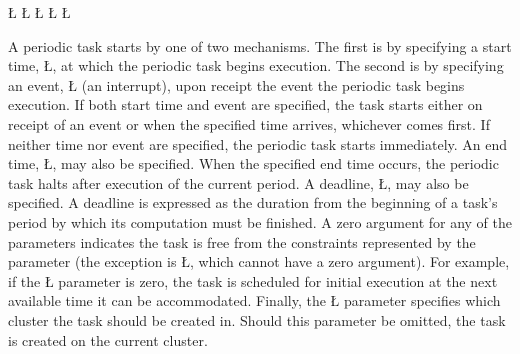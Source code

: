 \documentclass[openright,twoside]{report}
\begin{document}
\L{\LB{}}
\L{\LB{}}
\L{\LB{}}
\L{\LB{}}
\L{\LB{\};}}
\endlgrinde\LGend
{}%
%

A periodic task starts by one of two mechanisms.
The first is by specifying a start time, \LGinlinetrue\LGbegin\lgrinde\L{}\endlgrinde\LGend{}, at which the periodic task begins execution.
The second is by specifying an event, \LGinlinetrue\LGbegin\lgrinde\L{}\endlgrinde\LGend{} (an interrupt), upon receipt the event the periodic task begins execution.
If both start time and event are specified, the task starts either on receipt of an event or when the specified time arrives, whichever comes first.
If neither time nor event are specified, the periodic task starts immediately.
An end time, \LGinlinetrue\LGbegin\lgrinde\L{}\endlgrinde\LGend{}, may also be specified.
When the specified end time occurs, the periodic task halts after execution of the current period.
A deadline, \LGinlinetrue\LGbegin\lgrinde\L{}\endlgrinde\LGend{}, may also be specified.
A deadline is expressed as the duration from the beginning of a task's period by which its computation must be finished.
A zero argument for any of the parameters indicates the task is free from the constraints represented by the parameter (the exception is \LGinlinetrue\LGbegin\lgrinde\L{}\endlgrinde\LGend{}, which cannot have a zero argument).
For example, if the \LGinlinetrue\LGbegin\lgrinde\L{}\endlgrinde\LGend{} parameter is zero, the task is scheduled for initial execution at the next available time it can be accommodated.
Finally, the \LGinlinetrue\LGbegin\lgrinde\L{}\endlgrinde\LGend{} parameter specifies which cluster the task should be created in.
Should this parameter be omitted, the task is created on the current cluster.
\end{document}
